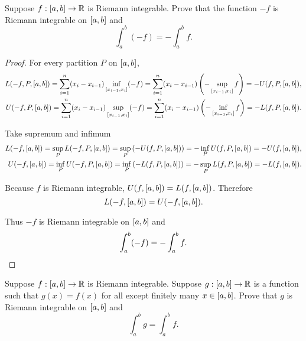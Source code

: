 \begin{exercise}\label{chapter1:sectionA:exercise5}
    Suppose $f: \left[{a, b}\right]\to\mathbb{R}$ is Riemann integrable. Prove that the function $-f$ is Riemann integrable on $\left[{a, b}\right]$ and
    \[
        \int^{b}_{a}(-f) = -\int^{b}_{a}f.
    \]
\end{exercise}

\begin{proof}
    For every partition $P$ on $\left[{a, b}\right]$,
    \[
        \begin{split}
            L(-f, P, \left[{a, b}\right]) = \sum^{n}_{i=1}(x_{i} - x_{i-1})\inf\limits_{\left[{x_{i-1}, x_{i}}\right]}(-f) = \sum^{n}_{i=1}(x_{i} - x_{i-1})\left(-\sup\limits_{\left[{x_{i-1}, x_{i}}\right]}f\right) = -U(f, P, \left[{a, b}\right]), \\
            U(-f, P, \left[{a, b}\right]) = \sum^{n}_{i=1}(x_{i} - x_{i-1})\sup\limits_{\left[{x_{i-1}, x_{i}}\right]}(-f) = \sum^{n}_{i=1}(x_{i} - x_{i-1})\left(-\inf\limits_{\left[{x_{i-1}, x_{i}}\right]}f\right) = -L(f, P, \left[{a, b}\right]).
        \end{split}
    \]

    Take supremum and infimum
    \[
        \begin{split}
            L(-f, \left[{a, b}\right]) = \sup\limits_{P}L(-f, P, \left[{a, b}\right]) = \sup\limits_{P}\left(-U(f, P, \left[{a, b}\right])\right) = -\inf\limits_{P} U(f, P, \left[{a, b}\right]) = -U(f, \left[{a,b}\right]), \\
            U(-f, \left[{a, b}\right]) = \inf\limits_{P}U(-f, P, \left[{a, b}\right]) = \inf\limits_{P}\left(-L(f, P, \left[{a, b}\right])\right) = -\sup\limits_{P}L(f, P, \left[{a, b}\right]) = -L(f, \left[{a, b}\right]).
        \end{split}
    \]

    Because $f$ is Riemann integrable, $U(f, \left[{a, b}\right]) = L(f, \left[{a, b}\right])$. Therefore
    \[
        L(-f, \left[{a, b}\right]) = U(-f, \left[{a, b}\right]).
    \]

    Thus $-f$ is Riemann integrable on $\left[{a, b}\right]$ and
    \[
        \int^{b}_{a}(-f) = -\int^{b}_{a}f.\qedhere
    \]
\end{proof}
\newpage

\begin{exercise}\label{chapter1:sectionA:exercise6}
    Suppose $f: \left[{a,b}\right]\to\mathbb{R}$ is Riemann integrable. Suppose $g: \left[{a, b}\right]\to\mathbb{R}$ is a function such that $g(x) = f(x)$ for all except finitely many $x\in\left[{a, b}\right]$. Prove that $g$ is Riemann integrable on $\left[{a, b}\right]$ and
    \[
        \int^{b}_{a}g = \int^{b}_{a}f.
    \]
\end{exercise}

